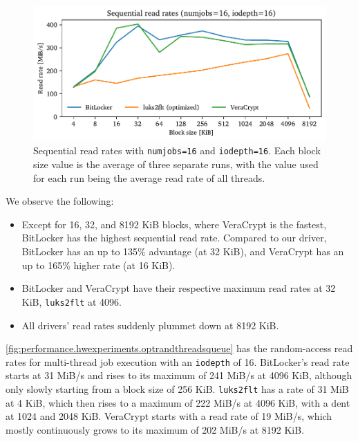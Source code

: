 \begin{figure}[htb!]
	\center
	\includegraphics[scale=1]{../fig/performance.hwexperiments.optseqthreadsqueue.pdf}
	\caption[
		Sequential read rates with \texttt{numjobs=16} and \texttt{iodepth=16}
	]{
		Sequential read rates with \texttt{numjobs=16} and \texttt{iodepth=16}. Each block size value is the average of three separate runs, with the value used for each run being the average read rate of all threads.
	}
	\label{fig:performance.hwexperiments.optseqthreadsqueue}
\end{figure}

We observe the following:
\begin{itemize}[beginpenalty=10000]
	\item Except for 16, 32, and 8192 KiB blocks, where VeraCrypt is the fastest, BitLocker has the highest sequential read rate. Compared to our driver, BitLocker has an up to 135\% advantage (at 32 KiB), and VeraCrypt has an up to 165\% higher rate (at 16 KiB).
	\item BitLocker and VeraCrypt have their respective maximum read rates at 32 KiB, \texttt{luks2flt} at 4096.
	\item All drivers' read rates suddenly plummet down at 8192 KiB.
\end{itemize}

\autoref{fig:performance.hwexperiments.optrandthreadsqueue} has the random-access read rates for multi-thread job execution with an \texttt{iodepth} of 16. BitLocker's read rate starts at 31 MiB/s and rises to its maximum of 241 MiB/s at 4096 KiB, although only slowly starting from a block size of 256 KiB. \texttt{luks2flt} has a rate of 31 MiB at 4 KiB, which then rises to a maximum of 222 MiB/s at 4096 KiB, with a dent at 1024 and 2048 KiB. VeraCrypt starts with a read rate of 19 MiB/s, which mostly continuously grows to its maximum of 202 MiB/s at 8192 KiB.

